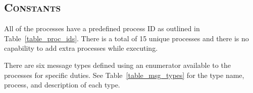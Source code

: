 \documentclass[oneside]{report}
\begin{document}
\subsection{\textsc{Constants}}
\label{sec:global_constants}



All of the processes have a predefined process ID as outlined in
Table~\ref{table_proc_ids}. There is a total of 15 unique processes and there
is no capability to add extra processes while executing. 

\begin{table}[H]
    \caption{Process IDs}    
    \label{table_proc_ids}
\end{table}

There are six message types defined using an enumerator available to the
processes for specific duties. See Table~\ref{table_msg_types} for the type
name, process, and description of each type.
\end{document}
